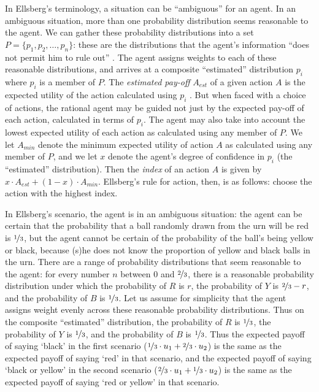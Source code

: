 In Ellsberg's terminology, a situation can be ``ambiguous'' for an agent. In an ambiguous situation, more than one probability distribution seems reasonable to the agent. We can gather these probability distributions into a set $P = \{p_1, p_2, \ldots, p_n\}$: these are the distributions that the agent's information ``does not permit him to rule out'' \citep[661]{Ellsberg1961}. The agent assigns weights to each of these reasonable distributions, and arrives at a composite ``estimated'' distribution $p_i$ where $p_i$ is a member of $P$. The \textit{estimated pay-off} $A_{est}$ of a given action $A$ is the expected utility of the action calculated using $p_i$ \citep[661]{Ellsberg1961}.  But when faced with a choice of actions, the rational agent may be guided not just by the expected pay-off of each action, calculated in terms of $p_i$. The agent may also take into account the lowest expected utility of each action as calculated using any member of $P$. We let $A_{min}$ denote the minimum expected utility of action $A$ as calculated using any member of $P$, and we let $x$ denote the agent's degree of confidence in $p_i$ (the ``estimated'' distribution). Then the \textit{index} of an action $A$ is given by $x \cdot A_{est} + (1-x) \cdot A_{min}$. Ellsberg's rule for action, then, is as follows: choose the action with the highest index. 

In Ellsberg's scenario, the agent is in an ambiguous situation: the agent can be certain that the probability that a ball randomly drawn from the urn will be red is $\nicefrac{1}{3}$, but the agent cannot be certain of the probability of the ball's being yellow or black, because (s)he does not know the proportion of yellow and black balls in the urn. There are a range of probability distributions that seem reasonable to the agent: for every number $n$ between $0$ and $\nicefrac{2}{3}$, there is a reasonable probability distribution under which the probability of $R$ is $r$, the probability of $Y$ is $\nicefrac{2}{3}-r$, and the probability of $B$ is $\nicefrac{1}{3}$. Let us assume for simplicity that the agent assigns weight evenly across these reasonable probability distributions. Thus on the composite ``estimated'' distribution, the probability of $R$ is $\nicefrac{1}{3}$, the probability of $Y$ is $\nicefrac{1}{3}$, and the probability of $B$ is $\nicefrac{1}{3}$. Thus the expected payoff of saying `black' in the first scenario ($\nicefrac{1}{3} \cdot u_1 + \nicefrac{2}{3} \cdot u_2$) is the same as the expected payoff of saying `red' in that scenario, and the expected payoff of saying `black or yellow' in the second scenario ($\nicefrac{2}{3} \cdot u_1 + \nicefrac{1}{3} \cdot u_2$) is the same as the expected payoff of saying `red or yellow' in that scenario.
 
